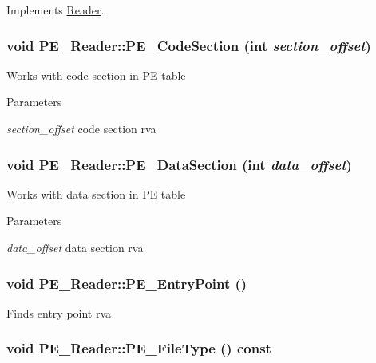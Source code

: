 Implements \hyperlink{classReader_a48b1d822c048d481388fe05ff90b10f3}{Reader}.

\hypertarget{classPE__Reader_a70cf8c6c789cc8c5c96a2b9179043a24}{
\subsubsection[{PE\_\-CodeSection}]{\setlength{\rightskip}{0pt plus 5cm}void PE\_\-Reader::PE\_\-CodeSection (int {\em section\_\-offset})}}
\label{classPE__Reader_a70cf8c6c789cc8c5c96a2b9179043a24}
Works with code section in PE table 
\begin{DoxyParams}{Parameters}
\item[{\em section\_\-offset}]code section rva \end{DoxyParams}
\hypertarget{classPE__Reader_a8303dc43c8732907ea8eff507728262b}{
\subsubsection[{PE\_\-DataSection}]{\setlength{\rightskip}{0pt plus 5cm}void PE\_\-Reader::PE\_\-DataSection (int {\em data\_\-offset})}}
\label{classPE__Reader_a8303dc43c8732907ea8eff507728262b}
Works with data section in PE table 
\begin{DoxyParams}{Parameters}
\item[{\em data\_\-offset}]data section rva \end{DoxyParams}
\hypertarget{classPE__Reader_a37d6bf9d6e462f964d77115e29c22418}{
\subsubsection[{PE\_\-EntryPoint}]{\setlength{\rightskip}{0pt plus 5cm}void PE\_\-Reader::PE\_\-EntryPoint ()}}
\label{classPE__Reader_a37d6bf9d6e462f964d77115e29c22418}
Finds entry point rva \hypertarget{classPE__Reader_a492ea400cbf11105f029faab31d0f3fa}{
\subsubsection[{PE\_\-FileType}]{\setlength{\rightskip}{0pt plus 5cm}void PE\_\-Reader::PE\_\-FileType () const}}
